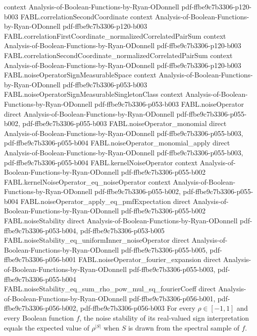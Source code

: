 \begin{theorem}
  {context}
  {Analysis-of-Boolean-Functions-by-Ryan-ODonnell}
  {pdf-ffbe9c7b3306-p120-b003}
\proofstep
  {FABL.correlationSecondCoordinate}
  {context}
  {Analysis-of-Boolean-Functions-by-Ryan-ODonnell}
  {pdf-ffbe9c7b3306-p120-b003}
\proofstep
  {FABL.correlationFirstCoordinate_normalizedCorrelatedPairSum}
  {context}
  {Analysis-of-Boolean-Functions-by-Ryan-ODonnell}
  {pdf-ffbe9c7b3306-p120-b003}
\proofstep
  {FABL.correlationSecondCoordinate_normalizedCorrelatedPairSum}
  {context}
  {Analysis-of-Boolean-Functions-by-Ryan-ODonnell}
  {pdf-ffbe9c7b3306-p120-b003}
\proofstep
  {FABL.noiseOperatorSignMeasurableSpace}
  {context}
  {Analysis-of-Boolean-Functions-by-Ryan-ODonnell}
  {pdf-ffbe9c7b3306-p053-b003}
\proofstep
  {FABL.noiseOperatorSignMeasurableSingletonClass}
  {context}
  {Analysis-of-Boolean-Functions-by-Ryan-ODonnell}
  {pdf-ffbe9c7b3306-p053-b003}
\proofstep
  {FABL.noiseOperator}
  {direct}
  {Analysis-of-Boolean-Functions-by-Ryan-ODonnell}
  {pdf-ffbe9c7b3306-p055-b002,
    pdf-ffbe9c7b3306-p055-b003}
\proofstep
  {FABL.noiseOperator_monomial}
  {direct}
  {Analysis-of-Boolean-Functions-by-Ryan-ODonnell}
  {pdf-ffbe9c7b3306-p055-b003,
    pdf-ffbe9c7b3306-p055-b004}
\proofstep
  {FABL.noiseOperator_monomial_apply}
  {direct}
  {Analysis-of-Boolean-Functions-by-Ryan-ODonnell}
  {pdf-ffbe9c7b3306-p055-b003,
    pdf-ffbe9c7b3306-p055-b004}
\proofstep
  {FABL.kernelNoiseOperator}
  {context}
  {Analysis-of-Boolean-Functions-by-Ryan-ODonnell}
  {pdf-ffbe9c7b3306-p055-b002}
\proofstep
  {FABL.kernelNoiseOperator_eq_noiseOperator}
  {context}
  {Analysis-of-Boolean-Functions-by-Ryan-ODonnell}
  {pdf-ffbe9c7b3306-p055-b002,
    pdf-ffbe9c7b3306-p055-b004}
\proofstep
  {FABL.noiseOperator_apply_eq_pmfExpectation}
  {direct}
  {Analysis-of-Boolean-Functions-by-Ryan-ODonnell}
  {pdf-ffbe9c7b3306-p055-b002}
\proofstep
  {FABL.noiseStability}
  {direct}
  {Analysis-of-Boolean-Functions-by-Ryan-ODonnell}
  {pdf-ffbe9c7b3306-p053-b004,
    pdf-ffbe9c7b3306-p053-b005}
\proofstep
  {FABL.noiseStability_eq_uniformInner_noiseOperator}
  {direct}
  {Analysis-of-Boolean-Functions-by-Ryan-ODonnell}
  {pdf-ffbe9c7b3306-p055-b005,
    pdf-ffbe9c7b3306-p056-b001}
\proofstep
  {FABL.noiseOperator_fourier_expansion}
  {direct}
  {Analysis-of-Boolean-Functions-by-Ryan-ODonnell}
  {pdf-ffbe9c7b3306-p055-b003,
    pdf-ffbe9c7b3306-p055-b004}
\proofstep
  {FABL.noiseStability_eq_sum_rho_pow_mul_sq_fourierCoeff}
  {direct}
  {Analysis-of-Boolean-Functions-by-Ryan-ODonnell}
  {pdf-ffbe9c7b3306-p056-b001,
    pdf-ffbe9c7b3306-p056-b002,
    pdf-ffbe9c7b3306-p056-b003}
For every $\rho\in[-1,1]$ and every Boolean function $f$, the noise stability of its
real-valued sign interpretation equals the expected value of $\rho^{|S|}$ when $S$ is
drawn from the spectral sample of $f$.
\end{theorem}

